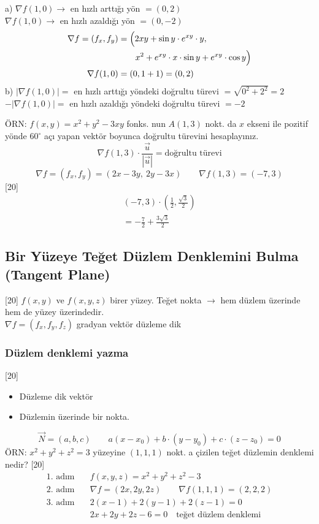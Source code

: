 \documentclass[11pt,a4paper]{article}
\begin{document}
a) $\nabla f(1,0)\to$ en hızlı arttığı yön $=(0,2)$\\
$\nabla f(1,0)\to$ en hızlı azaldığı yön $=(0,-2)$
\begin{align*}
\nabla f=(f_x,f_y)&=\Bigl(2xy+\sin y\cdot e^{xy}\cdot y,\\
&\qquad x^2+e^{xy}\cdot x\cdot\sin y+e^{xy}\cdot\cos y\Bigr)\\
\nabla f(1,0)&=(0,1+1)=(0,2)
\end{align*}
b) $|\nabla f(1,0)|=$ en hızlı arttığı yöndeki doğrultu türevi $=\sqrt{0^2+2^2}=2$\\
$-|\nabla f(1,0)|=$ en hızlı azaldığı yöndeki doğrultu türevi $=-2$

ÖRN: $f(x,y)=x^2+y^2-3xy$ fonks. nun $A(1,3)$ nokt. da $x$ ekseni ile pozitif yönde $60^\circ$ açı yapan vektör boyunca doğrultu türevini hesaplayınız.
\[ \nabla f(1,3)\cdot\frac{\vec{u}}{|\vec{u}|}=\text{doğrultu türevi} \]
\[ \nabla f=(f_x,f_y)=(2x-3y,\ 2y-3x)\qquad\nabla f(1,3)=(-7,3) \]
[20]
\begin{gather*}
(-7,3)\cdot\left(\frac12,\frac{\sqrt3}{2}\right)\\
=-\frac72+\frac{3\sqrt3}{2}
\end{gather*}

\subsection{Bir Yüzeye Teğet Düzlem Denklemini Bulma (Tangent Plane)}
[20]
$f(x,y)$ ve $f(x,y,z)$ birer yüzey. Teğet nokta $\to$ hem düzlem üzerinde hem de yüzey üzerindedir.\\
$\nabla f=(f_x,f_y,f_z)$ gradyan vektör düzleme dik

\subsubsection{Düzlem denklemi yazma}
[20]
\begin{itemize}[label=$\ast$,nosep]
\item Düzleme dik vektör
\item Düzlemin üzerinde bir nokta.
\end{itemize}
\[ \vec{N}=(a,b,c)\qquad a(x-x_0)+b\cdot(y-y_0)+c\cdot(z-z_0)=0 \]
ÖRN: $x^2+y^2+z^2=3$ yüzeyine $(1,1,1)$ nokt. a çizilen teğet düzlemin denklemi nedir?
[20]
\begin{align*}
\text{1. adım}&\quad f(x,y,z)=x^2+y^2+z^2-3\\
\text{2. adım}&\quad\nabla f=(2x,2y,2z)\qquad\nabla f(1,1,1)=(2,2,2)\\
\text{3. adım}&\quad2(x-1)+2(y-1)+2(z-1)=0\\
&\quad2x+2y+2z-6=0\quad\text{teğet düzlem denklemi}
\end{align*}
\end{document}
